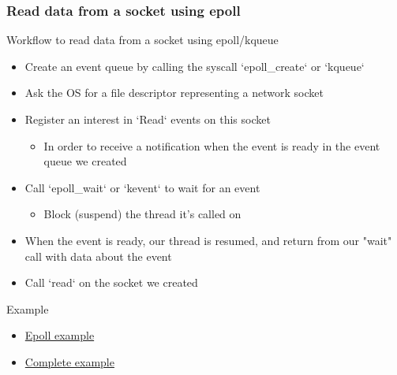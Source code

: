 \begin{frame}[fragile]
    \frametitle{Read data from a socket using epoll}
% 
% 
{\color{red}Workflow to read data from a socket using epoll/kqueue}
% 
    \begin{itemize}
        \item Create an event queue by calling the syscall `epoll_create` or `kqueue`
        \item Ask the OS for a file descriptor representing a network socket
        \item Register an interest in `Read` events on this socket
    	\begin{itemize}
    	    \item In order to receive a notification when the event is ready in the event queue we created
    	\end{itemize}
        \item Call `epoll_wait` or `kevent` to wait for an event
    	\begin{itemize}
    	    \item Block (suspend) the thread it's called on
    	\end{itemize}
        \item When the event is ready, our thread is resumed, and return from our "wait" call with data about the event
        \item Call `read` on the socket we created
    \end{itemize}
% 
{\color{red}Example}
% 
    \begin{itemize}
        \item \href{http://man7.org/linux/man-pages/man7/epoll.7.html}{Epoll example}
        \item \href{https://www.suchprogramming.com/epoll-in-3-easy-steps/}{Complete example}
    \end{itemize}

\end{frame}
